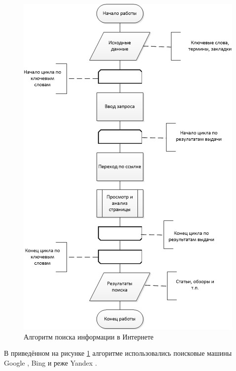 \begin{figure}[H]
	\centering
		\includegraphics[scale=1.0]{images/searchalg.png}
	\caption{\small Алгоритм поиска информации в Интернете}
	\label{fig:searchalg}
\end{figure}

В приведённом на рисунке \ref{fig:searchalg} алгоритме использовались поисковые машины Google \cite{google}, Bing \cite{bing} и реже Yandex \cite{yandex}.


